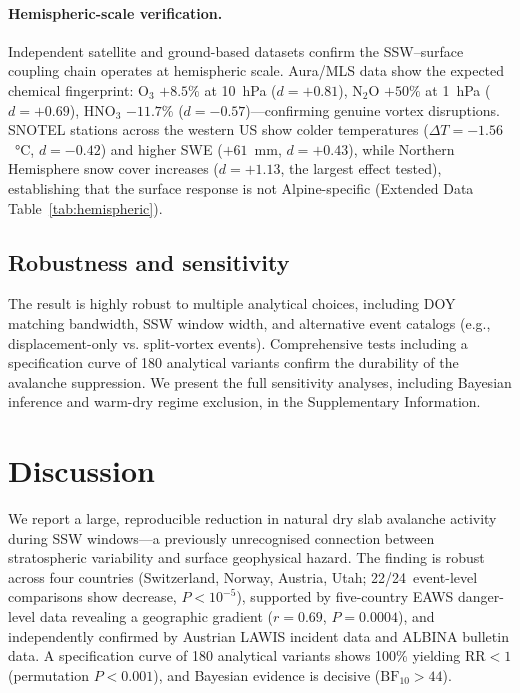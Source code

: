 \documentclass[11pt,letterpaper]{article}
\begin{document}
\paragraph{Hemispheric-scale verification.} Independent satellite and ground-based datasets confirm the SSW--surface coupling chain operates at hemispheric scale. Aura/MLS data show the expected chemical fingerprint: O$_3$ $+8.5\%$ at 10~hPa ($d = +0.81$), N$_2$O $+50\%$ at 1~hPa ($d = +0.69$), HNO$_3$ $-11.7\%$ ($d = -0.57$)---confirming genuine vortex disruptions. SNOTEL stations across the western US show colder temperatures ($\Delta T = -1.56$~°C, $d = -0.42$) and higher SWE ($+61$~mm, $d = +0.43$), while Northern Hemisphere snow cover increases ($d = +1.13$, the largest effect tested), establishing that the surface response is not Alpine-specific (Extended Data Table~\ref{tab:hemispheric}).

\subsection*{Robustness and sensitivity}

The result is highly robust to multiple analytical choices, including DOY matching bandwidth, SSW window width, and alternative event catalogs (e.g., displacement-only vs. split-vortex events). Comprehensive tests including a specification curve of 180 analytical variants confirm the durability of the avalanche suppression. We present the full sensitivity analyses, including Bayesian inference and warm-dry regime exclusion, in the Supplementary Information.

\section*{Discussion}

We report a large, reproducible reduction in natural dry slab avalanche activity during SSW windows---a previously unrecognised connection between stratospheric variability and surface geophysical hazard. The finding is robust across four countries (Switzerland, Norway, Austria, Utah; 22/24~event-level comparisons show decrease, $P < 10^{-5}$), supported by five-country EAWS danger-level data revealing a geographic gradient ($r = 0.69$, $P = 0.0004$), and independently confirmed by Austrian LAWIS incident data and ALBINA bulletin data. A specification curve of 180 analytical variants shows 100\% yielding $\mathrm{RR} < 1$ (permutation $P < 0.001$), and Bayesian evidence is decisive ($\mathrm{BF}_{10} > 44$).
\end{document}
